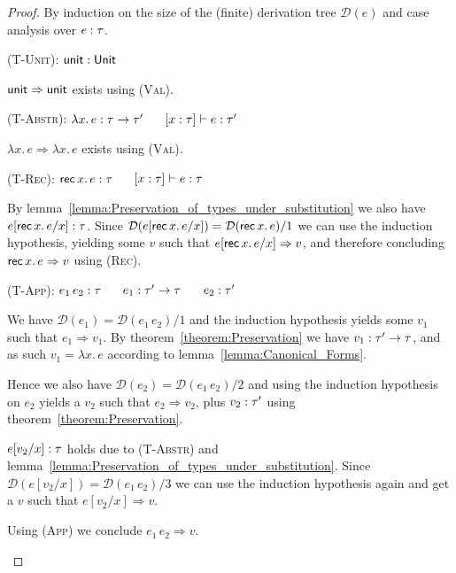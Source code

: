 \documentclass[12pt,a2paper,draft]{article}
\newcommand{\abstr}[2]{\ensuremath{\lambda{#1}.\,{#2}}}
\newcommand{\app}[2]{\ensuremath{{#1}\,{#2}}}
\newcommand{\rec}[2]{\ensuremath{{\normalfont\textsf{rec}}\,{#1}.\,{#2}}}
\newcommand{\unit}{\ensuremath{\normalfont\textsf{unit}}}
\newcommand{\Unit}{\ensuremath{\normalfont\textsf{Unit}}}
\newcommand{\tj}[2]{\mbox{\ensuremath{{#1}:{#2}}}}
\newcommand{\Tj}[3]{\mbox{\ensuremath{{#1}\vdash\tj{#2}{#3}}}}
\newcommand{\tree}[1]{\mathcal{D}(#1)}
\begin{document}
\begin{proof}
  By induction on the size of the (finite) derivation tree $\tree{e}$ and case analysis
  over $\tj{e}{\tau}$.
  \begin{description}
  \item \textsc{(T-Unit)}: $\tj{\unit}{\Unit}$

    $\unit \Rightarrow \unit$ exists using \textsc{(Val)}.

  \item \textsc{(T-Abstr)}: $\tj{\abstr{x}{e}}{\tau \to \tau'}$ $\quad$ $\Tj{[x:\tau]}{e}{\tau'}$

    $\abstr{x}{e} \Rightarrow \abstr{x}{e}$ exists using \textsc{(Val)}.

  \item \textsc{(T-Rec)}: $\tj{\rec{x}{e}}{\tau}$ $\quad$ $\Tj{[x:\tau]}{e}{\tau}$

    By lemma~\ref{lemma:Preservation_of_types_under_substitution}
    we also have $\tj{e[\rec{x}{e}/x]}{\tau}$. Since $\tree{e[\rec{x}{e}/x]} = \tree{\rec{x}{e}}/1$ we
    can use the induction hypothesis, yielding some $v$ such that $e[\rec{x}{e}/x] \Rightarrow v$,
    and therefore concluding $\rec{x}{e} \Rightarrow v$ using \textsc{(Rec)}.

  \item \textsc{(T-App)}: $\tj{\app{e_1}{e_2}}{\tau}$ $\quad$ $\tj{e_1}{\tau'\to\tau}$ $\quad$ $\tj{e_2}{\tau'}$

    We have $\tree{e_1} = \tree{\app{e_1}{e_2}}/1$ and the induction hypothesis yields
    some $v_1$ such that $e_1 \Rightarrow v_1$. By theorem~\ref{theorem:Preservation} we
    have $\tj{v_1}{\tau'\to\tau}$, and as such $v_1 = \abstr{x}{e}$ according to lemma~\ref{lemma:Canonical_Forms}.

    Hence we also have $\tree{e_2} = \tree{\app{e_1}{e_2}}/2$ and using the induction hypothesis
    on $e_2$ yields a $v_2$ such that $e_2 \Rightarrow v_2$, plus $\tj{v_2}{\tau'}$ using
    theorem~\ref{theorem:Preservation}.

    $\tj{e[v_2/x]}{\tau}$ holds due to \textsc{(T-Abstr)} and
    lemma~\ref{lemma:Preservation_of_types_under_substitution}. Since
    $\tree{e[v_2/x]} = \tree{\app{e_1}{e_2}}/3$ we can use the induction hypothesis again and
    get a $v$ such that $e[v_2/x] \Rightarrow v$.

    Using \textsc{(App)} we conclude $\app{e_1}{e_2} \Rightarrow v$.
  \end{description}
\end{proof}
\end{document}
